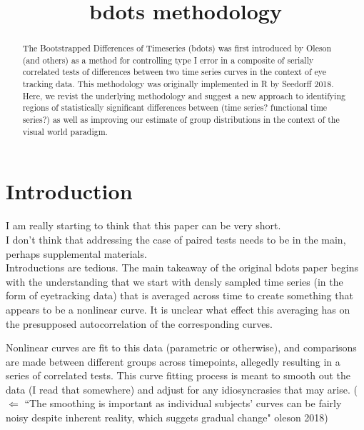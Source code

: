 \documentclass{article}
\title{bdots methodology}
\date{}
\begin{document}

\maketitle

%

\begin{abstract}
The Bootstrapped Differences of Timeseries (bdots) was first introduced by Oleson (and others) as a method for controlling type I error in a composite of serially correlated tests of differences between two time series curves in the context of eye tracking data.  This methodology was originally implemented in R by Seedorff 2018. Here, we revist the underlying methodology and suggest a new approach to identifying regions of statistically significant differences between (time series? functional time series?) as well as improving our estimate of group distributions in the context of the visual world paradigm.
\end{abstract}

\section{Introduction}

I am really starting to think that this paper can be very short.\\

I don't think that addressing the case of paired tests needs to be in the main, perhaps supplemental materials. \\


Introductions are tedious. The main takeaway of the original bdots paper begins with the understanding that we start with densly sampled time series (in the form of eyetracking data) that is averaged across time to create something that appears to be a nonlinear curve. It is unclear what effect this averaging has on the presupposed autocorrelation of the corresponding curves.

Nonlinear curves are fit to this data (parametric or otherwise), and comparisons are made between different groups across timepoints, allegedly resulting in a series of correlated tests. This curve fitting process is meant to smooth out the data (I read that somewhere) and adjust for any idiosyncrasies that may arise. ($\Leftarrow$ ``The smoothing is important as individual subjects' curves can be fairly noisy despite inherent reality, which suggets gradual change" oleson 2018)
\end{document}
